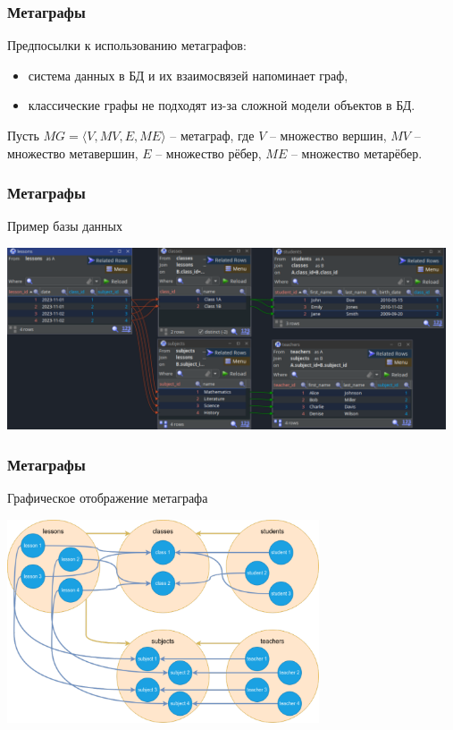 \documentclass[pdf, hyperref={unicode}, aspectratio=169]{beamer}
\begin{document}
\begin{frame}
\frametitle{Метаграфы}
	Предпосылки к использованию метаграфов:

	\begin{itemize}
		\item система данных в БД и их взаимосвязей напоминает граф,
		\item классические графы не подходят из-за сложной модели объектов в БД.
	\end{itemize}

	Пусть $MG = \langle V, MV, E, ME \rangle$ -- метаграф, где $V$ -- множество вершин, $MV$ -- множество метавершин, $E$ -- множество рёбер, $ME$ -- множество метарёбер.
\end{frame}


\begin{frame}
\frametitle{Метаграфы}
	Пример базы данных

	\begin{center}
		\includegraphics[width = 13cm]{img/jailer-example-db}
	\end{center}
\end{frame}


\begin{frame}
\frametitle{Метаграфы}
	Графическое отображение метаграфа

	\begin{center}
		\includegraphics[height = 6cm]{img/drawio-metagraph}
	\end{center}
\end{frame}
\end{document}
